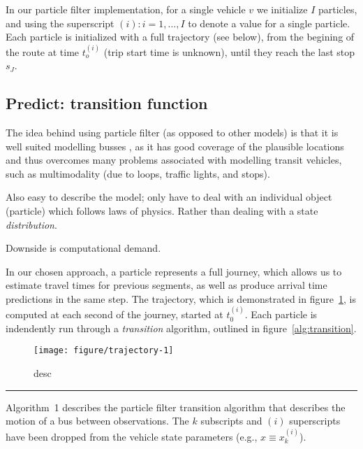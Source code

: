 \documentclass[draftcls,a4paper,onecolumn]{IEEEtran}\usepackage[]{graphicx}\usepackage[]{color}
\newenvironment{knitrout}{}{} %
\begin{document}
In our particle filter implementation,
for a single vehicle $v$ we initialize $I$ particles,
and using the superscript $(i) : i = 1, \ldots, I$ to denote 
a value for a single particle.
Each particle is initialized with a full trajectory (see below),
from the begining of the route at time $t_o^{(i)}$ (trip start time is unknown),
until they reach the last stop $s_J$.



\subsection{Predict: transition function}
The idea behind using particle filter (as opposed to other models)
is that it is well suited modelling busses \cite{Hans_2015},
as it has good coverage of the plausible locations and thus overcomes
many problems associated with modelling transit vehicles,
such as multimodality (due to loops, traffic lights, and stops).

Also easy to describe the model;
only have to deal with an individual object (particle) which follows 
laws of physics.
Rather than dealing with a state \emph{distribution}.

Downside is computational demand.

In our chosen approach, a particle represents a full journey,
which allows us to estimate travel times for previous segments, 
as well as produce arrival time predictions in the same step.
The trajectory, which is demonstrated in figure~\ref{fig:trajectory},
is computed at each second of the journey, started at $t_0^{(i)}$.
Each particle is indendently run through a \emph{transition} algorithm,
outlined in figure~\ref{alg:transition}.

\begin{knitrout}
\color{fgcolor}\begin{figure}
\texttt{[image: figure/trajectory-1]} \caption[short desc]{desc}\label{fig:trajectory}
\end{figure}


\end{knitrout}


\vspace{1em}\hrule\vspace{1em}

Algorithm~1 describes the particle filter transition algorithm that
describes the motion of a bus between observations.
The $k$ subscripts and $(i)$ superscripts have been dropped from the
vehicle state parameters (e.g., $x \equiv x_k^{(i)}$).
\end{document}
